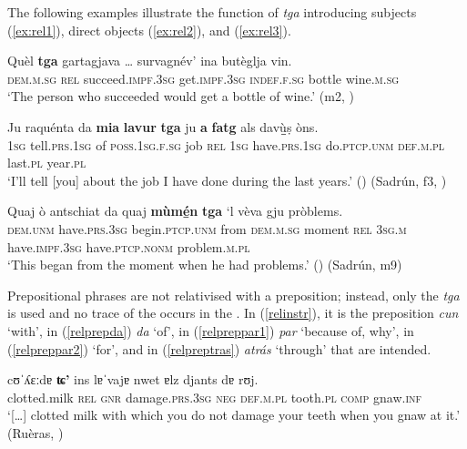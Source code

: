 The following examples illustrate the function of \textit{tga} introducing subjects (\ref{ex:rel1}), direct objects (\ref{ex:rel2}), and  (\ref{ex:rel3}).

\ea
\label{ex:rel1}
\gll    Quèl \textbf{tga} gartagjava … survagnév’ ina butèglja vin.\\
\textsc{dem.m.sg} \textsc{rel} succeed.\textsc{impf.3sg} {} get.\textsc{impf.3sg} \textsc{indef.f.sg} bottle wine.\textsc{m.sg}\\
\glt `The person who succeeded would get a bottle of wine.' (m2, )
\z

\ea\label{ex:rel2}
\gll   Ju raquénta da \textbf{mia} \textbf{lavur} \textbf{tga} ju \textbf{\textbf{a}} \textbf{fatg} als dav{\`u̱̱}ṣ òns. \\
\textsc{1sg} tell.\textsc{prs.1sg} of \textsc{poss.1sg.f.sg} job \textsc{rel} \textsc{1sg}  have.\textsc{prs.1sg} do.\textsc{ptcp.unm} \textsc{def.m.pl} last.\textsc{pl} year.\textsc{pl}\\
\glt `I’ll tell [you] about the job I have done during the last years.' () (Sadrún, f3, )
\z

\ea\label{ex:rel3}
\gll Quaj ò antschiat da quaj \textbf{mùm{\'e̱}n} \textbf{tga} `l vèva gju pròblems. \\
\textsc {dem.unm} have.\textsc{prs.3sg} begin.\textsc{ptcp.unm} from \textsc{dem.m.sg} moment \textsc{rel} \textsc{3sg.m} have.\textsc{impf.3sg} have.\textsc{ptcp.nonm}  problem.\textsc{m.pl} \\ 
\glt `This began from the moment when he had problems.' () (Sadrún, m9)
\z


Prepositional phrases are not relativised with a preposition; instead, only the  \textit{tga} is used and no trace of the  occurs in the . In (\ref{relinstr}), it is the preposition \textit{cun} `with', in (\ref{relprepda}) \textit{da} `of', in (\ref{relpreppar1}) \textit{par} `because of, why', in (\ref{relpreppar2}) `for', and in (\ref{relpreptras}) \textit{atrás} `through' that are intended.

\ea\label{relinstr}
\gll    […] cʊˈʎɛːdɐ \textbf{ʨ'} ins lɐˈvajɐ nwet ɐlz djants dɐ rʊj.\\
{} clotted.milk \textsc{rel} \textsc{gnr} damage.\textsc{prs.3sg} \textsc{neg} \textsc{def.m.pl} tooth.\textsc{pl} \textsc{comp} gnaw.\textsc{inf} \\
\glt `[…] clotted milk with which you do not damage your teeth when you gnaw at it.' (Ruèras, \citealt[8f.]{Valär2013b})
\z

